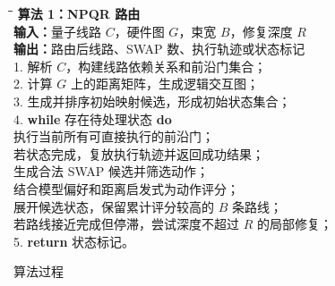 \begin{figure}[H]
  \centering
  \begin{minipage}{0.94\linewidth}
  \begin{tabbing}
  \hspace{1.8em}\=\hspace{1.8em}\=\hspace{1.8em}\=\kill
  \textbf{算法 1：NPQR 路由}\\
  \textbf{输入：}量子线路 $C$，硬件图 $G$，束宽 $B$，修复深度 $R$\\
  \textbf{输出：}路由后线路、SWAP 数、执行轨迹或状态标记\\
  1. 解析 $C$，构建线路依赖关系和前沿门集合；\\
  2. 计算 $G$ 上的距离矩阵，生成逻辑交互图；\\
  3. 生成并排序初始映射候选，形成初始状态集合；\\
  4. \textbf{while} 存在待处理状态 \textbf{do}\\
   执行当前所有可直接执行的前沿门；\\
   若状态完成，复放执行轨迹并返回成功结果；\\
   生成合法 SWAP 候选并筛选动作；\\
   结合模型偏好和距离启发式为动作评分；\\
   展开候选状态，保留累计评分较高的 $B$ 条路线；\\
   若路线接近完成但停滞，尝试深度不超过 $R$ 的局部修复；\\
  5. \textbf{return} 状态标记。
  \end{tabbing}
  \end{minipage}
  \caption{算法过程}
  \label{alg:npqr}
\end{figure}

